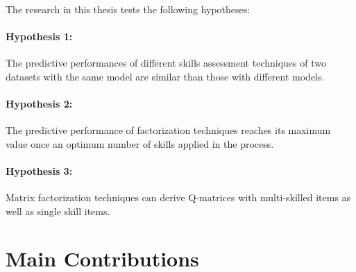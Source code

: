\paragraph{}The research in this thesis tests the following hypotheses:
\paragraph{Hypothesis 1:} The predictive performances of different skills assessment techniques of two datasets with the same model are  similar than those with different models. 
\paragraph{Hypothesis 2:} The predictive performance of factorization techniques reaches its maximum value once an optimum number of skills applied in the process.
\paragraph{Hypothesis 3:}Matrix factorization techniques can derive Q-matrices with multi-skilled items as well as single skill items. 

\section{Main Contributions}
